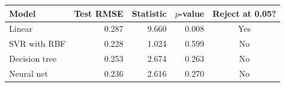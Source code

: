 \begin{tabular}{lrrrc}
\toprule
Model & Test RMSE & Statistic & $p$-value & Reject at 0.05? \\
\midrule
Linear & 0.287 & 9.660 & 0.008 & Yes \\
SVR with RBF & 0.228 & 1.024 & 0.599 & No \\
Decision tree & 0.253 & 2.674 & 0.263 & No \\
Neural net & 0.236 & 2.616 & 0.270 & No \\
\bottomrule
\end{tabular}
